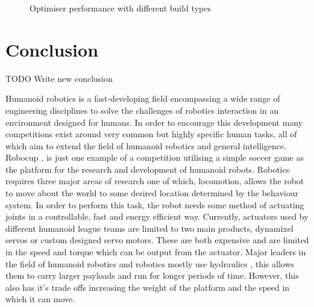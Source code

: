 \documentclass[11pt,a4paper]{article}
\begin{document}
\begin{figure}[hbt!]
    \centering
    \caption{Optimiser performance with different build types}
    \label{fig:optimiser_process_time}
\end{figure}



\clearpage
\section{Conclusion}
\label{sec:conclusion}
TODO Write new conclusion

Humanoid robotics is a fast-developing field encompassing a wide range of engineering disciplines to solve the challenges of robotics interaction in an environment designed for humans. In order to encourage this development many competitions exist around very common but highly specific human tasks, all of which aim to extend the field of humanoid robotics and general intelligence. Robocup \cite{kitano1995robocup}, is just one example of a competition utilising a simple soccer game as the platform for the research and development of humanoid robots. Robotics requires three major areas of research one of which, locomotion, allows the robot to move about the world to some desired location determined by the behaviour system. In order to perform this task, the robot needs some method of actuating joints in a controllable, fast and energy efficient way. Currently, actuators used by different humanoid league teams are limited to two main products, dynamixel servos \cite{robotis_mx106} or custom designed servo motors. These are both expensive and are limited in the speed and torque which can be output from the actuator. Major leaders in the field of humanoid robotics and robotics mostly use hydraulics \cite{atlas}, this allows them to carry larger payloads and run for longer periods of time. However, this also has it's trade offs increasing the weight of the platform and the speed in which it can move. \newline
\end{document}
